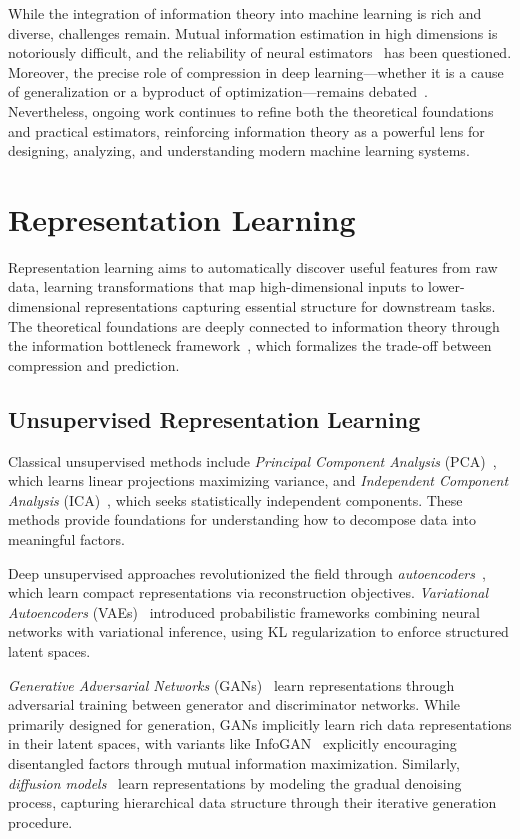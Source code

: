 \documentclass[11pt, oneside]{book}
\theoremstyle{plain}
\theoremstyle{definition}
\theoremstyle{remark}
\begin{document}
While the integration of information theory into machine learning is rich and diverse, challenges remain. Mutual information estimation in high dimensions is notoriously difficult, and the reliability of neural estimators~\cite{belghazi2018mutual} has been questioned. Moreover, the precise role of compression in deep learning—whether it is a cause of generalization or a byproduct of optimization—remains debated~\cite{saxe2019information}. Nevertheless, ongoing work continues to refine both the theoretical foundations and practical estimators, reinforcing information theory as a powerful lens for designing, analyzing, and understanding modern machine learning systems.


\section{Representation Learning}

Representation learning aims to automatically discover useful features from raw data, learning transformations that map high-dimensional inputs to lower-dimensional representations capturing essential structure for downstream tasks. The theoretical foundations are deeply connected to information theory through the information bottleneck framework~\citep{tishby2000information}, which formalizes the trade-off between compression and prediction.

\subsection{Unsupervised Representation Learning}

Classical unsupervised methods include \emph{Principal Component Analysis} (PCA)~\citep{pearson1901liii}, which learns linear projections maximizing variance, and \emph{Independent Component Analysis} (ICA)~\citep{hyvarinen2000independent}, which seeks statistically independent components. These methods provide foundations for understanding how to decompose data into meaningful factors.

Deep unsupervised approaches revolutionized the field through \emph{autoencoders}~\citep{hinton2006reducing}, which learn compact representations via reconstruction objectives. \emph{Variational Autoencoders} (VAEs)~\citep{kingma2014auto,rezende2014stochastic} introduced probabilistic frameworks combining neural networks with variational inference, using KL regularization to enforce structured latent spaces.

\emph{Generative Adversarial Networks} (GANs)~\citep{goodfellow2014generative} learn representations through adversarial training between generator and discriminator networks. While primarily designed for generation, GANs implicitly learn rich data representations in their latent spaces, with variants like InfoGAN~\citep{chen2016infogan} explicitly encouraging disentangled factors through mutual information maximization. Similarly, \emph{diffusion models}~\citep{ho2020denoising,song2020score} learn representations by modeling the gradual denoising process, capturing hierarchical data structure through their iterative generation procedure.
\end{document}
